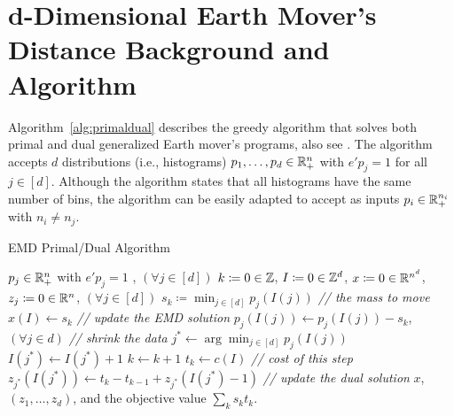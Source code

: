 \section{d-Dimensional Earth Mover's Distance Background and Algorithm}\label{sec:suppdemd}
Algorithm~\ref{alg:primaldual} describes the greedy algorithm that solves both primal and dual generalized Earth mover's programs, also see \citep{kline2019properties}. The algorithm accepts $d$ distributions (i.e., histograms) $p_1,\ldots,p_d\in\mathbb{R}^{n}_+$ with $e'p_j=1$ for all $j\in[d]$. 
Although the algorithm states that all histograms have the same number of bins, the algorithm can be 
easily adapted to accept as inputs $p_i\in\mathbb{R}^{n_i}_+$ with $n_i\not=n_j$.
\iffalse
\begin{algorithm}
\caption{EMD Primal/Dual Algorithm}\label{alg:primaldual}
\begin{algorithmic}
 $p_j\in\mathbb{R}^{n}_+$ with $e'p_j=1$ , $(\forall j\in[d])$
\State  $k \coloneqq 0\in\mathbb{Z}$, $I \coloneqq 0\in\mathbb{Z}^{d}$, $x \coloneqq 0\in\mathbb{R}^{n^{d}}$, $z_j\coloneqq 0\in\mathbb{R}^{n}$, $(\forall j\in [d])$
    \State $s_k\coloneqq \min_{j\in[d]} p_j(I(j))$ {\em\hspace*{\fill}  // the mass to move}
    \State $x(I)\gets s_k$  {\em \hspace*{\fill} // update the EMD solution}
    \State $p_j(I(j))\gets p_j(I(j))-s_k$, $(\forall j\in d)${\em\hspace*{\fill} // shrink the data}
    \State $j^*\gets\arg\min_{j\in[d]} p_j(I(j))$
    \State $I(j^*)\gets I(j^*)+1$
    \State $k\gets k+1$
    \State $t_k\gets c(I)${\em\hspace*{\fill} // cost of this step}
        \State  $z_{j^*}(I(j^*))\gets t_k-t_{k-1} + z_{j^*}(I(j^*)-1)$ {\em\hspace*{\fill} // update the dual solution}
    \EndIf
\EndWhile
\State \Return $x$, $(z_1,\ldots,z_d)$, and the objective value $\sum_k s_k t_k$.
\end{algorithmic}
\end{algorithm}
